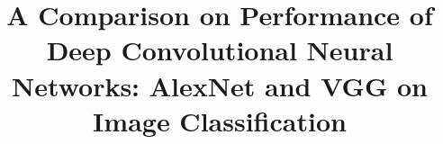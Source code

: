\documentclass{sig-alternate}
\begin{document}
%

\title{A Comparison on Performance of Deep Convolutional Neural Networks: AlexNet and VGG on Image Classification}
%
%
%
%
%
\end{document}
